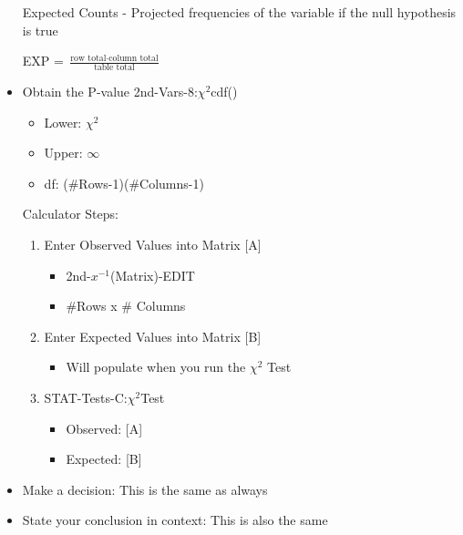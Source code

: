 \documentclass[../stats.tex]{subfiles}
\begin{document}
\begin{itemize}
    Expected Counts - Projected frequencies of the variable if the null hypothesis is true 
    \begin{center}
        EXP = $\frac{\text{row total}\cdot \text{column total}}{\text{table total}}$
    \end{center}

    \item Obtain the P-value 
    2nd-Vars-8:$\chi^2$cdf() 
    \begin{itemize}
        \item Lower: $\chi^2$
        \item Upper: $\infty$
        \item df: (\#Rows-1)(\#Columns-1)
    \end{itemize}

    Calculator Steps:
    \begin{enumerate}
        \item Enter Observed Values into Matrix [A]
        \begin{itemize}
            \item 2nd-$x^{-1}$(Matrix)-EDIT 
            \item \#Rows x \# Columns 
        \end{itemize}
        \item Enter Expected Values into Matrix [B]
        \begin{itemize}
            \item Will populate when you run the $\chi^2$ Test 
        \end{itemize}
        \item STAT-Tests-C:$\chi^2$Test 
        \begin{itemize}
            \item Observed: [A]
            \item Expected: [B]
        \end{itemize}
    \end{enumerate}

    \item Make a decision: This is the same as always 
    \item State your conclusion in context: This is also the same 
\end{itemize}
\end{document}
